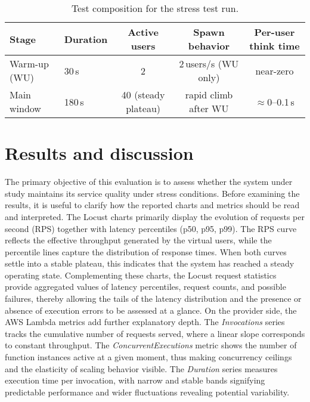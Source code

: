 \documentclass[11pt,a4paper]{article}
\begin{document}
\begin{table}[h]
\centering
\small
\caption{Test composition for the stress test run.}
\label{tab:hhA-plan}
\begin{tabular}{llccc}
\toprule
Stage & Duration & Active users & Spawn behavior & Per-user think time \\
\midrule
Warm-up (WU) & 30\,s  & 2 & 2\,users/s (WU only) & near-zero \\
Main window  & 180\,s & 40 (steady plateau) & rapid climb after WU & $\approx$0--0.1\,s \\
\bottomrule
\end{tabular}
\end{table}

\section{Results and discussion}
The primary objective of this evaluation is to assess whether the system under study maintains its service quality under stress conditions. 
Before examining the results, it is useful to clarify how the reported charts and metrics should be read and interpreted. The Locust charts primarily display the evolution of requests per second (RPS) together with latency percentiles (p50, p95, p99). The RPS curve reflects the effective throughput generated by the virtual users, while the percentile lines capture the distribution of response times. When both curves settle into a stable plateau, this indicates that the system has reached a steady operating state.
Complementing these charts, the Locust request statistics provide aggregated values of latency percentiles, request counts, and possible failures, thereby allowing the tails of the latency distribution and the presence or absence of execution errors to be assessed at a glance. On the provider side, the AWS Lambda metrics add further explanatory depth. The \emph{Invocations} series tracks the cumulative number of requests served, where a linear slope corresponds to constant throughput. The \emph{ConcurrentExecutions} metric shows the number of function instances active at a given moment, thus making concurrency ceilings and the elasticity of scaling behavior visible. The \emph{Duration} series measures execution time per invocation, with narrow and stable bands signifying predictable performance and wider fluctuations revealing potential variability. 
\end{document}
